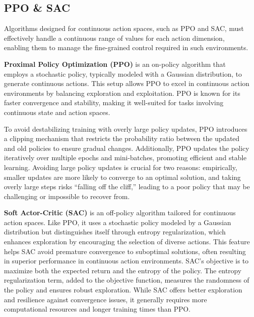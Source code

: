 \documentclass{article}
\begin{document}
\subsection{PPO \& SAC}
Algorithms designed for continuous action spaces, such as PPO and SAC, must effectively handle a continuous range of values for each action dimension, enabling them to manage the fine-grained control required in such environments.

\textbf{Proximal Policy Optimization (PPO)} is an on-policy algorithm that employs a stochastic policy, typically modeled with a Gaussian distribution, to generate continuous actions. This setup allows PPO to excel in continuous action environments by balancing exploration and exploitation. PPO is known for its faster convergence and stability, making it well-suited for tasks involving continuous state and action spaces. 

To avoid destabilizing training with overly large policy updates, PPO introduces a clipping mechanism that restricts the probability ratio between the updated and old policies to ensure gradual changes. Additionally, PPO updates the policy iteratively over multiple epochs and mini-batches, promoting efficient and stable learning. Avoiding large policy updates is crucial for two reasons: empirically, smaller updates are more likely to converge to an optimal solution, and taking overly large steps risks “falling off the cliff,” leading to a poor policy that may be challenging or impossible to recover from. \cite{ppo_sac}

\textbf{Soft Actor-Critic (SAC)} is an off-policy algorithm tailored for continuous action spaces. Like PPO, it uses a stochastic policy modeled by a Gaussian distribution but distinguishes itself through entropy regularization, which enhances exploration by encouraging the selection of diverse actions. This feature helps SAC avoid premature convergence to suboptimal solutions, often resulting in superior performance in continuous action environments. SAC’s objective is to maximize both the expected return and the entropy of the policy. The entropy regularization term, added to the objective function, measures the randomness of the policy and ensures robust exploration. While SAC offers better exploration and resilience against convergence issues, it generally requires more computational resources and longer training times than PPO. \cite{ppo_sac}

\newpage
\end{document}
